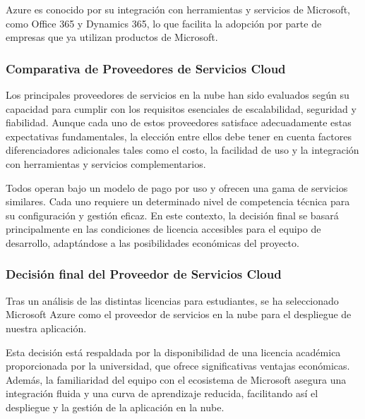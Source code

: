 Azure es conocido por su integración con herramientas y servicios de Microsoft, como Office 365 y Dynamics 365, lo que facilita la adopción por parte de empresas que ya utilizan productos de Microsoft.



\subsubsection{Comparativa de Proveedores de Servicios Cloud}
Los principales proveedores de servicios en la nube han sido evaluados según su capacidad para cumplir con los requisitos esenciales de escalabilidad, seguridad y fiabilidad. 
Aunque cada uno de estos proveedores satisface adecuadamente estas expectativas fundamentales, la elección entre ellos debe tener en cuenta factores diferenciadores adicionales tales como el costo, 
la facilidad de uso y la integración con herramientas y servicios complementarios.

Todos operan bajo un modelo de pago por uso y ofrecen una gama de servicios similares. Cada uno requiere un determinado nivel de competencia técnica para su configuración y 
gestión eficaz. En este contexto, la decisión final se basará principalmente en las condiciones de licencia accesibles para el equipo de desarrollo, 
adaptándose a las posibilidades económicas del proyecto.

\subsubsection{Decisión final del Proveedor de Servicios Cloud}
Tras un análisis de las distintas licencias para estudiantes, se ha seleccionado Microsoft Azure como el proveedor de servicios en la nube para el despliegue de nuestra aplicación. 

Esta decisión está respaldada por la disponibilidad de una licencia académica proporcionada por la universidad, que ofrece significativas ventajas económicas. 
Además, la familiaridad del equipo con el ecosistema de Microsoft asegura una integración fluida y una curva de aprendizaje reducida, facilitando así el despliegue y la gestión de la aplicación en la nube.

